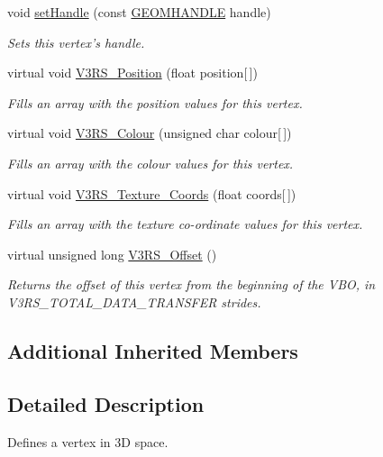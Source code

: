 \begin{DoxyCompactItemize}
void \hyperlink{class_vertex3_d_a53670951cc49d1b5ae9d03d08a11d581}{set\-Handle} (const \hyperlink{vertex_8h_a72202e57358ed73cd212e9a2eaf39aeb}{G\-E\-O\-M\-H\-A\-N\-D\-L\-E} handle)
\begin{DoxyCompactList}\small\item\em Sets this vertex's handle. \end{DoxyCompactList}\item 
virtual void \hyperlink{class_vertex3_d_a1d95bf448d6cf90c2ba78ab22167b806}{V3\-R\-S\-\_\-\-Position} (float position\mbox{[}$\,$\mbox{]})
\begin{DoxyCompactList}\small\item\em Fills an array with the position values for this vertex. \end{DoxyCompactList}\item 
virtual void \hyperlink{class_vertex3_d_a40126d514f76cfef6ebf2855380338e1}{V3\-R\-S\-\_\-\-Colour} (unsigned char colour\mbox{[}$\,$\mbox{]})
\begin{DoxyCompactList}\small\item\em Fills an array with the colour values for this vertex. \end{DoxyCompactList}\item 
virtual void \hyperlink{class_vertex3_d_aea2d1d899ec54fc166fd04baeee64a91}{V3\-R\-S\-\_\-\-Texture\-\_\-\-Coords} (float coords\mbox{[}$\,$\mbox{]})
\begin{DoxyCompactList}\small\item\em Fills an array with the texture co-\/ordinate values for this vertex. \end{DoxyCompactList}\item 
virtual unsigned long \hyperlink{class_vertex3_d_a13a922fd8180591636c1daf4687cc205}{V3\-R\-S\-\_\-\-Offset} ()
\begin{DoxyCompactList}\small\item\em Returns the offset of this vertex from the beginning of the V\-B\-O, in V3\-R\-S\-\_\-\-T\-O\-T\-A\-L\-\_\-\-D\-A\-T\-A\-\_\-\-T\-R\-A\-N\-S\-F\-E\-R strides. \end{DoxyCompactList}\end{DoxyCompactItemize}
\subsection*{Additional Inherited Members}


\subsection{Detailed Description}
Defines a vertex in 3\-D space. 

